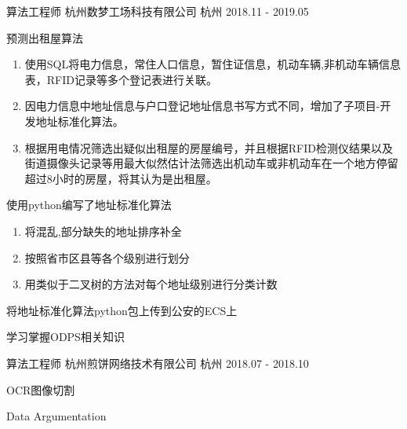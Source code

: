 \begin{cventries}
  \cventry
    {算法工程师} %
    {杭州数梦工场科技有限公司} %
    {杭州} %
    {2018.11 - 2019.05} %
    {
      \begin{cvitems} %
        \item {预测出租屋算法}
        \begin{enumerate}
        \item 使用SQL将电力信息，常住人口信息，暂住证信息，机动车辆,非机动车辆信息表，RFID记录等多个登记表进行关联。
        \item 因电力信息中地址信息与户口登记地址信息书写方式不同，增加了子项目-开发地址标准化算法。
        \item 根据用电情况筛选出疑似出租屋的房屋编号，并且根据RFID检测仪结果以及街道摄像头记录等用最大似然估计法筛选出机动车或非机动车在一个地方停留超过8小时的房屋，将其认为是出租屋。
        \end{enumerate}
        \item {使用python编写了地址标准化算法}
        \begin{enumerate}
        \item 将混乱,部分缺失的地址排序补全
        \item 按照省市区县等各个级别进行划分
        \item 用类似于二叉树的方法对每个地址级别进行分类计数
        \end{enumerate}
        \item {将地址标准化算法python包上传到公安的ECS上}
        \item {学习掌握ODPS相关知识}
      \end{cvitems}
    }

  \cventry
    {算法工程师} %
    {杭州煎饼网络技术有限公司} %
    {杭州} %
    {2018.07 - 2018.10} %
    {
      \begin{cvitems} %
        \item {OCR图像切割}
        \item {Data Argumentation}
      \end{cvitems}
    }

\end{cventries}

